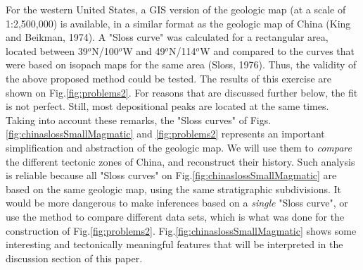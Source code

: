 \documentclass{article}
\begin{document}
 For the western United States, a  GIS version of the geologic map (at
 a  scale of 1:2,500,000)  is available,  in a  similar format  as the
 geologic map of China (King  and Beikman, 1974).  A "Sloss curve" was
 calculated for  a rectangular area,  located between 39$^o$N/100$^o$W
 and 49$^o$N/114$^o$W  and compared to  the curves that were  based on
 isopach maps for the same  area (Sloss, 1976).  Thus, the validity of
 the  above proposed  method could  be  tested.  The  results of  this
 exercise are shown on  Fig.\ref{fig:problems2}.  For reasons that are
 discussed  further  below,  the  fit  is  not  perfect.  Still,  most
 depositional  peaks  are located  at  the  same  times.  Taking  into
 account    these    remarks,   the    "Sloss    curves"   of    Figs.
 \ref{fig:chinaslossSmallMagmatic}  and \ref{fig:problems2} represents
 an important  simplification and abstraction of the  geologic map. We
 will use them to {\it compare} the different tectonic zones of China,
 and reconstruct their history.  Such analysis is reliable because all
 "Sloss curves" on  Fig.\ref{fig:chinaslossSmallMagmatic} are based on
 the same geologic map,  using the same stratigraphic subdivisions. It
 would be  more dangerous to make  inferences based on  a {\it single}
 "Sloss  curve", or  use the  method to  compare different  data sets,
 which    is    what    was    done   for    the    construction    of
 Fig.\ref{fig:problems2}.  Fig.\ref{fig:chinaslossSmallMagmatic} shows
 some interesting  and tectonically  meaningful features that  will be
 interpreted in the discussion section of this paper.\\
\end{document}
